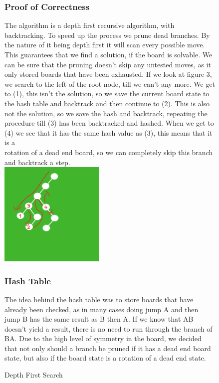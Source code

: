 \documentclass[11pt]{article}
\begin{document}
\newpage
\begin{figure}
\subsubsection*{Proof of Correctness}
The algorithm is a depth first recursive algorithm, with backtracking. To speed up the process we prune dead branches. By the nature of it being depth first it will scan every possible move. This guarantees that we find a solution, if the board is solvable. We can be sure that the pruning doesn't skip any untested moves, as it only stored boards that have been exhausted. 
If we look at figure 3, we search to the left of the root node, till we can't any more. We get to (1), this isn't the solution, so we save the current board state to the hash table and backtrack and then continue to (2). This is also not the solution, so we save the hash and backtrack, repeating the procedure till (3) has been backtracked and hashed.
When we get to (4) we see that it has the same hash value as (3), this means that it is a\\ rotation of a dead end board, so we can completely skip this branch and backtrack a step.
\newline\\
\includegraphics[width=5cm]{3}
\caption{Depth First Search} 
\label{fig: 3}
\subsubsection*{Hash Table}
The idea behind the hash table was to store boards that have already been checked, as in many cases doing jump A and then jump B has the same result as B then A. If we know that AB doesn't yield a result, there is no need to run through the branch of BA.
Due to the high level of symmetry in the board, we decided that not only should a branch be pruned if it has a dead end board state, but also if the board state is a rotation of a dead end state. 
\end{figure}
\newpage
\end{document}
